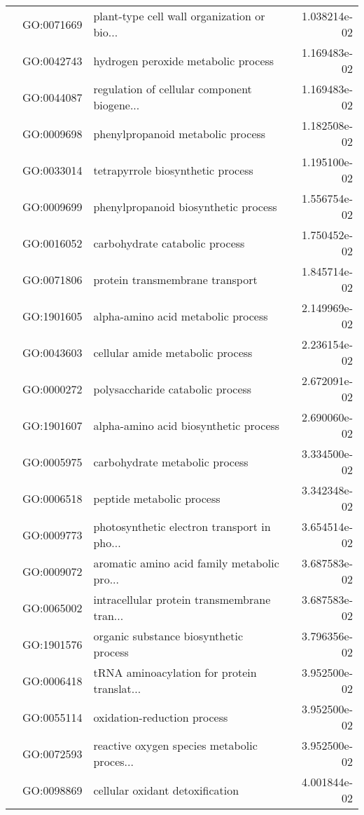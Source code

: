 \begin{longtable}{lllr}
   & GO:0071669 &  plant-type cell wall organization or bio... &  1.038214e-02 \\
   & GO:0042743 &          hydrogen peroxide metabolic process &  1.169483e-02 \\
   & GO:0044087 &  regulation of cellular component biogene... &  1.169483e-02 \\
   & GO:0009698 &            phenylpropanoid metabolic process &  1.182508e-02 \\
   & GO:0033014 &            tetrapyrrole biosynthetic process &  1.195100e-02 \\
   & GO:0009699 &         phenylpropanoid biosynthetic process &  1.556754e-02 \\
   & GO:0016052 &               carbohydrate catabolic process &  1.750452e-02 \\
   & GO:0071806 &              protein transmembrane transport &  1.845714e-02 \\
   & GO:1901605 &           alpha-amino acid metabolic process &  2.149969e-02 \\
   & GO:0043603 &             cellular amide metabolic process &  2.236154e-02 \\
   & GO:0000272 &             polysaccharide catabolic process &  2.672091e-02 \\
   & GO:1901607 &        alpha-amino acid biosynthetic process &  2.690060e-02 \\
   & GO:0005975 &               carbohydrate metabolic process &  3.334500e-02 \\
   & GO:0006518 &                    peptide metabolic process &  3.342348e-02 \\
   & GO:0009773 &  photosynthetic electron transport in pho... &  3.654514e-02 \\
   & GO:0009072 &  aromatic amino acid family metabolic pro... &  3.687583e-02 \\
   & GO:0065002 &  intracellular protein transmembrane tran... &  3.687583e-02 \\
   & GO:1901576 &       organic substance biosynthetic process &  3.796356e-02 \\
   & GO:0006418 &  tRNA aminoacylation for protein translat... &  3.952500e-02 \\
   & GO:0055114 &                  oxidation-reduction process &  3.952500e-02 \\
   & GO:0072593 &  reactive oxygen species metabolic proces... &  3.952500e-02 \\
   & GO:0098869 &              cellular oxidant detoxification &  4.001844e-02 \\

\end{longtable}
